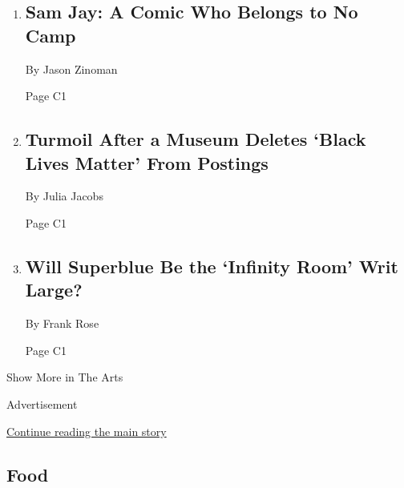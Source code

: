 \begin{enumerate}
\def\labelenumi{\arabic{enumi}.}
\item
  \href{/2020/08/04/arts/television/sam-jay-netflix-special.html}{}

  \hypertarget{sam-jay-a-comic-who-belongs-to-no-camp-1}{%
  \subsection{Sam Jay: A Comic Who Belongs to No
  Camp}\label{sam-jay-a-comic-who-belongs-to-no-camp-1}}

  By Jason Zinoman

  Page C1
\item
  \href{/2020/08/04/arts/design/seattle-childrens-museum.html}{}

  \hypertarget{turmoil-after-a-museum-deletes-black-lives-matter-from-postings}{%
  \subsection{Turmoil After a Museum Deletes `Black Lives Matter' From
  Postings}\label{turmoil-after-a-museum-deletes-black-lives-matter-from-postings}}

  By Julia Jacobs

  Page C1
\item
  \href{/2020/08/04/arts/superblue-immersive-art-pace-jobs.html}{}

  \hypertarget{will-superblue-be-the-infinity-room-writ-large-1}{%
  \subsection{Will Superblue Be the `Infinity Room' Writ
  Large?}\label{will-superblue-be-the-infinity-room-writ-large-1}}

  By Frank Rose

  Page C1
\end{enumerate}

Show More in The Arts

Advertisement

\protect\hyperlink{after-mid5}{Continue reading the main story}

\hypertarget{food}{%
\subsection{Food}\label{food}}

